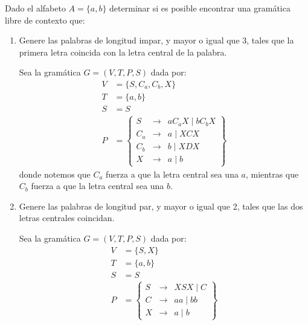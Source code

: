 \begin{ejercicio}
    Dado el alfabeto $A = \{a, b\}$ determinar si es posible encontrar una gramática libre de contexto que:
    \begin{enumerate}
        \item Genere las palabras de longitud impar, y mayor o igual que 3, tales que la primera letra coincida con la letra central de la palabra.
        
        Sea la gramática $G=\left(V,T,P,S\right)$ dada por:
        \begin{align*}
            V &= \{S, C_a, C_b, X\} \\
            T &= \{a,b\} \\
            S &= S \\
            P &= \left\{
                \begin{array}{rcl}
                    S &\rightarrow & aC_aX \mid bC_bX \\
                    C_a & \rightarrow & a \mid XCX \\
                    C_b & \rightarrow & b \mid XDX \\
                    X &\rightarrow & a\mid b
                \end{array}
            \right\}
        \end{align*}
        donde notemos que $C_a$ fuerza a que la letra central sea una $a$, mientras que $C_b$ fuerza a que la letra central sea una $b$.
        \item Genere las palabras de longitud par, y mayor o igual que 2, tales que las dos letras centrales coincidan.
        
        Sea la gramática $G=\left(V,T,P,S\right)$ dada por:
        \begin{align*}
            V &= \{S, X\} \\
            T &= \{a,b\} \\
            S &= S \\
            P &= \left\{
                \begin{array}{rcl}
                    S &\rightarrow & XSX\mid C \\
                    C &\rightarrow & aa \mid bb \\
                    X &\rightarrow & a \mid b
                \end{array}
            \right\}
        \end{align*}
    \end{enumerate}
\end{ejercicio}

